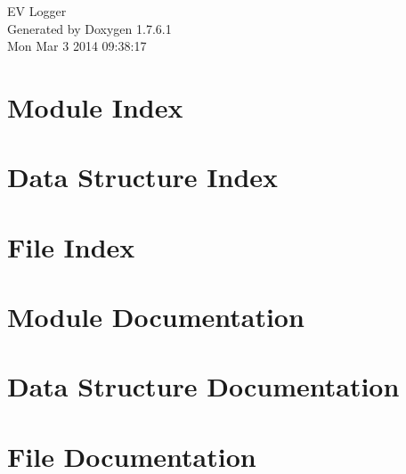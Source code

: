 \documentclass[a4paper]{book}
\begin{document}
\hypersetup{pageanchor=false,citecolor=blue}
\begin{titlepage}
\vspace*{7cm}
\begin{center}
{\Large \-E\-V \-Logger }\\
\vspace*{1cm}
{\large \-Generated by Doxygen 1.7.6.1}\\
\vspace*{0.5cm}
{\small Mon Mar 3 2014 09:38:17}\\
\end{center}
\end{titlepage}
\clearemptydoublepage
{}
\tableofcontents
\clearemptydoublepage
{}
\hypersetup{pageanchor=true,citecolor=blue}
\chapter{\-Module \-Index}

\chapter{\-Data \-Structure \-Index}

\chapter{\-File \-Index}

\chapter{\-Module \-Documentation}



\chapter{\-Data \-Structure \-Documentation}


\chapter{\-File \-Documentation}



















\printindex
\end{document}
